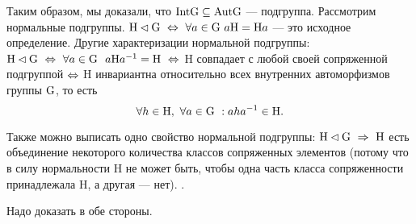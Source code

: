 \par Таким образом, мы доказали, что ${\rm Int G}\subseteq{\rm Aut G}$ --- подгруппа. Рассмотрим нормальные подгруппы.
${\rm H}\lhd{\rm G}\ \Leftrightarrow\ \forall a\in {\rm G}\ a{\rm H}={\rm H}a$ --- это исходное определение. Другие характеризации нормальной подгруппы:
${\rm H}\lhd {\rm G}\ \Leftrightarrow\ \forall a\in{\rm G}\ \ a{\rm H}a^{-1}={\rm H}\ \Leftrightarrow\ $\rr H совпадает с любой своей сопряженной подгруппой$\ \Leftrightarrow\ $\rr H инвариантна относительно всех
внутренних автоморфизмов группы ${\rm G}$, то есть $$\forall h\in \rr H,\ \forall a\in\rr G\ : aha^{-1}\in\rr H.$$
\par Также можно выписать одно свойство нормальной подгруппы: ${\rm H}\lhd {\rm G}\ \Rightarrow\ {\rm H}$ есть объединение некоторого количества классов сопряженных элементов (потому что в силу нормальности \rr H
не может быть, чтобы одна часть класса сопряженности принадлежала \rr H, а другая --- нет).
.
\par\dok Надо доказать в обе стороны.
